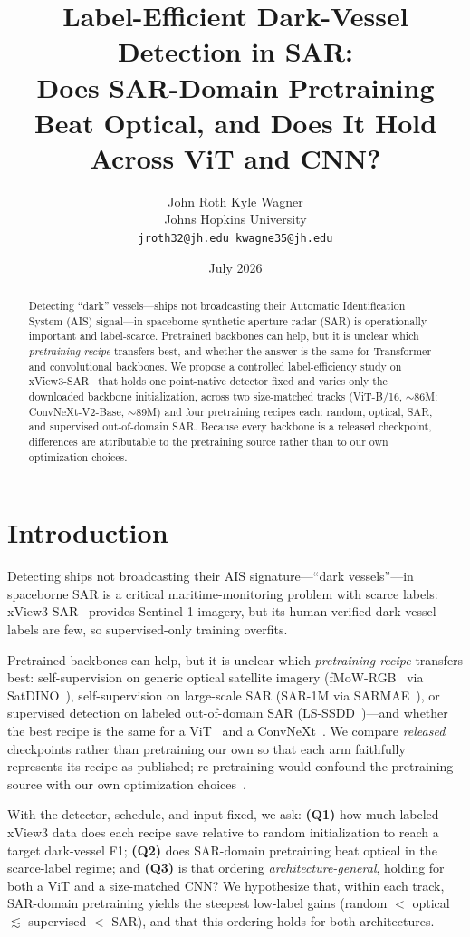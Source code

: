 \documentclass[10pt,twocolumn,letterpaper]{article}
\title{Label-Efficient Dark-Vessel Detection in SAR:\\
Does SAR-Domain Pretraining Beat Optical, and Does It Hold Across ViT and CNN?}
\author{John Roth \qquad Kyle Wagner\\
Johns Hopkins University\\
\texttt{\small jroth32@jh.edu \qquad kwagne35@jh.edu}}
\date{July 2026}
\begin{document}
\maketitle

\begin{abstract}
Detecting ``dark'' vessels---ships not broadcasting their Automatic
Identification System (AIS) signal---in spaceborne synthetic aperture radar
(SAR) is operationally important and label-scarce. Pretrained backbones can
help, but it is unclear which \emph{pretraining recipe} transfers best, and
whether the answer is the same for Transformer and convolutional backbones. We
propose a controlled label-efficiency study on
xView3-SAR~\cite{paolo2022xview3} that holds one point-native detector fixed and
varies only the downloaded backbone initialization, across two size-matched
tracks (ViT-B/16, $\sim$86M; ConvNeXt-V2-Base, $\sim$89M) and four pretraining
recipes each: random, optical, SAR, and supervised out-of-domain SAR. Because
every backbone is a released checkpoint, differences are attributable to the
pretraining source rather than to our own optimization choices.
\end{abstract}

\section{Introduction}
\label{sec:intro}
Detecting ships not broadcasting their AIS signature---``dark vessels''---in
spaceborne SAR is a critical maritime-monitoring problem with scarce labels:
xView3-SAR~\cite{paolo2022xview3} provides Sentinel-1 imagery, but its
human-verified dark-vessel labels are few, so supervised-only training overfits.

Pretrained backbones can help, but it is unclear which \emph{pretraining recipe}
transfers best: self-supervision on generic optical satellite imagery
(fMoW-RGB~\cite{christie2018fmow} via SatDINO~\cite{straka2025satdino}),
self-supervision on large-scale SAR (SAR-1M via SARMAE~\cite{liu2026sarmae}), or
supervised detection on labeled out-of-domain SAR
(LS-SSDD~\cite{zhang2020lsssdd})---and whether the best recipe is the same for a
ViT~\cite{dosovitskiy2021image} and a ConvNeXt~\cite{woo2023convnextv2}. We
compare \emph{released} checkpoints rather than pretraining our own so that each
arm faithfully represents its recipe as published; re-pretraining would confound
the pretraining source with our own optimization
choices~\cite{zoph2020rethinking}.

With the detector, schedule, and input fixed, we ask:
\textbf{(Q1)} how much labeled xView3 data does each recipe save relative to
random initialization to reach a target dark-vessel F1;
\textbf{(Q2)} does SAR-domain pretraining beat optical in the scarce-label
regime; and \textbf{(Q3)} is that ordering \emph{architecture-general}, holding
for both a ViT and a size-matched CNN? We hypothesize that, within each track,
SAR-domain pretraining yields the steepest low-label gains
(random $<$ optical $\lesssim$ supervised $<$ SAR), and that this ordering holds
for both architectures.
\end{document}
